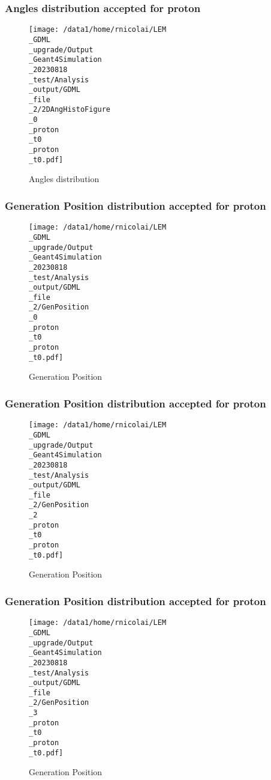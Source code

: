 \documentclass[8pt]{beamer}
\begin{document}
            \begin{frame}
                \frametitle{Angles distribution accepted for proton}
            
        \begin{figure}[h]
            \centering
            \texttt{[image: /data1/home/rnicolai/LEM\\\_GDML\\\_upgrade/Output\\\_Geant4Simulation\\\_20230818\\\_test/Analysis\\\_output/GDML\\\_file\\\_2/2DAngHistoFigure\\\_0\\\_proton\\\_t0\\\_proton\\\_t0.pdf]}
            \caption{Angles distribution}
        \end{figure}
        
            \end{frame}
            
            \begin{frame}
                \frametitle{Generation Position distribution accepted for proton}
            
        \begin{figure}[h]
            \centering
            \texttt{[image: /data1/home/rnicolai/LEM\\\_GDML\\\_upgrade/Output\\\_Geant4Simulation\\\_20230818\\\_test/Analysis\\\_output/GDML\\\_file\\\_2/GenPosition\\\_0\\\_proton\\\_t0\\\_proton\\\_t0.pdf]}
            \caption{Generation Position}
        \end{figure}
        
            \end{frame}
            
            \begin{frame}
                \frametitle{Generation Position distribution accepted for proton}
            
        \begin{figure}[h]
            \centering
            \texttt{[image: /data1/home/rnicolai/LEM\\\_GDML\\\_upgrade/Output\\\_Geant4Simulation\\\_20230818\\\_test/Analysis\\\_output/GDML\\\_file\\\_2/GenPosition\\\_2\\\_proton\\\_t0\\\_proton\\\_t0.pdf]}
            \caption{Generation Position}
        \end{figure}
        
            \end{frame}
            
            \begin{frame}
                \frametitle{Generation Position distribution accepted for proton}
            
        \begin{figure}[h]
            \centering
            \texttt{[image: /data1/home/rnicolai/LEM\\\_GDML\\\_upgrade/Output\\\_Geant4Simulation\\\_20230818\\\_test/Analysis\\\_output/GDML\\\_file\\\_2/GenPosition\\\_3\\\_proton\\\_t0\\\_proton\\\_t0.pdf]}
            \caption{Generation Position}
        \end{figure}
        
            \end{frame}
            
\end{document}
